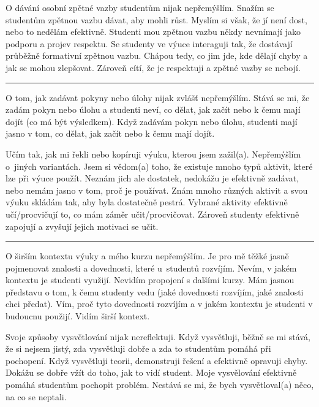 \newpage
{}
{O dávání osobní zpětné vazby studentům nijak nepřemýšlím.}
{Snažím se studentům zpětnou vazbu dávat, aby mohli růst. Myslím si však, že jí není dost, nebo to nedělám efektivně. Studenti mou zpětnou vazbu někdy nevnímají jako podporu a projev respektu.}
{Se studenty ve výuce interaguji tak, že dostávají průběžně formativní zpětnou vazbu. Chápou tedy, co jim jde, kde dělají chyby a jak se mohou zlepšovat. Zároveň cítí, že je respektuji a zpětné vazby se nebojí.}

\rule{\textwidth}{0.4pt}
{O tom, jak zadávat pokyny nebo úlohy nijak zvlášť nepřemýšlím.}
{Stává se mi, že zadám pokyn nebo úlohu a studenti neví, co dělat, jak začít nebo k čemu mají dojít (co má být výsledkem).}
{Když zadávám pokyn nebo úlohu, studenti mají jasno v tom, co dělat, jak začít nebo k čemu mají dojít.}

\newpage
{}
{Učím tak, jak mi řekli nebo kopíruji výuku, kterou jsem zažil(a). Nepřemýšlím o~jiných variantách.}
{Jsem si vědom(a) toho, že existuje mnoho typů aktivit, které lze při výuce použít. Neznám jich ale dostatek, nedokážu je efektivně zadávat, nebo nemám jasno v tom, proč je používat.}
{Znám mnoho různých aktivit a svou výuku skládám tak, aby byla dostatečně pestrá. Vybrané aktivity efektivně učí/procvičují to, co mám záměr učit/procvičovat. Zároveň studenty efektivně zapojují a zvyšují jejich motivaci se učit.}

\rule{\textwidth}{0.4pt}
{O širším kontextu výuky a mého kurzu nepřemýšlím.}
{Je pro mě těžké jasně pojmenovat znalosti a dovednosti, které u~studentů rozvíjím. Nevím, v jakém kontextu je studenti využijí. Nevidím propojení s dalšími kurzy.}
{Mám jasnou představu o tom, k čemu studenty vedu (jaké dovednosti rozvíjím, jaké znalosti chci předat). Vím, proč tyto dovednosti rozvíjím a v jakém kontextu je studenti v budoucnu použijí. Vidím širší kontext.}
\vspace*{-1em}

\newpage
{}
{Svoje způsoby vysvětlování nijak nereflektuji.}
{Když vysvětluji, běžně se mi stává, že si nejsem jistý, zda vysvětluji dobře a zda to studentům pomáhá při pochopení.}
{Když vysvětluji teorii, demonstruji řešení a efektivně opravuji chyby. Dokážu se dobře vžít do toho, jak to vidí student. Moje vysvělování efektivně pomáhá studentům pochopit problém. Nestává se mi, že bych vysvětloval(a) něco, na co se neptali.}

